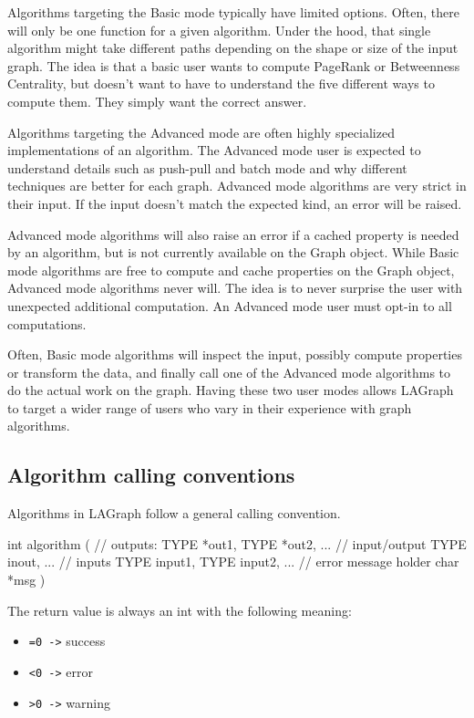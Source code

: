 Algorithms targeting the Basic mode typically have limited options. Often, there will only be one function for
a given algorithm. Under the hood, that single algorithm might take different paths depending on the shape or
size of the input graph. The idea is that a basic user wants to compute PageRank or Betweenness Centrality,
but doesn't want to have to understand the five different ways to compute them. They simply want the correct answer.

Algorithms targeting the Advanced mode are often highly specialized implementations of an algorithm. The Advanced
mode user is expected to understand details such as push-pull and batch mode and why different techniques are
better for each graph. Advanced mode algorithms are very strict in their input. If the input doesn't match the
expected kind, an error will be raised.

Advanced mode algorithms will also raise an error if a cached property is needed by an algorithm, but is not
currently available on the Graph object. While Basic mode algorithms are free to compute and cache properties
on the Graph object, Advanced mode algorithms never will. The idea is to never surprise the user with unexpected
additional computation. An Advanced mode user must opt-in to all computations.

Often, Basic mode algorithms will inspect the input, possibly compute properties or transform the data,
and finally call one of the Advanced mode algorithms to do the actual work on the graph. Having these two user
modes allows LAGraph to target a wider range of users who vary in their experience with graph algorithms.


\subsection{Algorithm calling conventions}

Algorithms in LAGraph follow a general calling convention.

\begin{cplus}
int algorithm
(
    // outputs:
    TYPE *out1,
    TYPE *out2,
    ...
    // input/output
    TYPE inout,
    ...
    // inputs
    TYPE input1,
    TYPE input2,
    ...
    // error message holder
    char *msg
)
\end{cplus}

The return value is always an int with the following meaning:

\begin{itemize}
    \item \verb'=0 ->' success
    \item \verb'<0 ->' error
    \item \verb'>0 ->' warning
\end{itemize}

